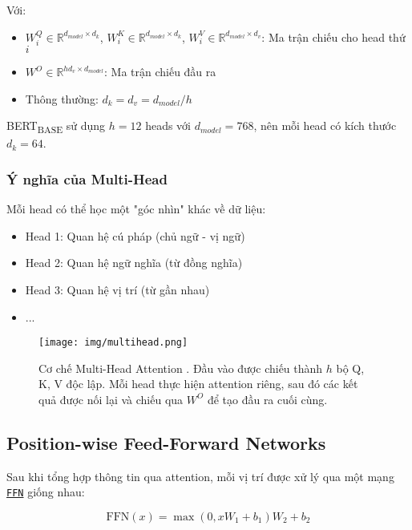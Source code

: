     Với:
    \begin{itemize}
        \item $W_i^Q \in \mathbb{R}^{d_{model} \times d_k}$, $W_i^K \in \mathbb{R}^{d_{model} \times d_k}$, $W_i^V \in \mathbb{R}^{d_{model} \times d_v}$: Ma trận chiếu cho head thứ $i$
        \item $W^O \in \mathbb{R}^{hd_v \times d_{model}}$: Ma trận chiếu đầu ra
        \item Thông thường: $d_k = d_v = d_{model}/h$
    \end{itemize}
    
    BERT\textsubscript{BASE} sử dụng $h=12$ heads với $d_{model}=768$, nên mỗi head có kích thước $d_k=64$.
    
    \subsubsection{Ý nghĩa của Multi-Head}
    Mỗi head có thể học một "góc nhìn" khác về dữ liệu:
    \begin{itemize}
        \item Head 1: Quan hệ cú pháp (chủ ngữ - vị ngữ)
        \item Head 2: Quan hệ ngữ nghĩa (từ đồng nghĩa)
        \item Head 3: Quan hệ vị trí (từ gần nhau)
        \item ...
    \end{itemize}
    
    \begin{figure}[H]
        \centering
        \texttt{[image: img/multihead.png]}
        \caption{Cơ chế Multi-Head Attention \cite{vaswani2017attention}. Đầu vào được chiếu thành $h$ bộ Q, K, V độc lập. Mỗi head thực hiện attention riêng, sau đó các kết quả được nối lại và chiếu qua $W^O$ để tạo đầu ra cuối cùng.}
        \label{fig:multi_head_attention}
    \end{figure}
    
    \subsection{Position-wise Feed-Forward Networks}
    \label{ssec:feed_forward_networks}
    
    Sau khi tổng hợp thông tin qua attention, mỗi vị trí được xử lý qua một mạng \hyperref[acro:ffn]{\texttt{FFN}} giống nhau:
    
    \begin{equation}
    \text{FFN}(x) = \max(0, xW_1 + b_1)W_2 + b_2
    \label{eq:ffn}
    \end{equation}
    
